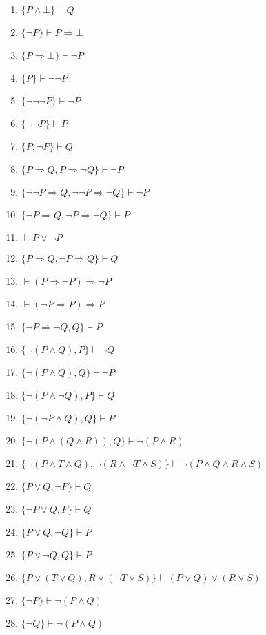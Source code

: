 \begin{enumerate}
    \item $\{P \land\bot \} \vdash Q$
    \item $\{\neg P\} \vdash P \Rightarrow  \bot$
    \item $\{P \Rightarrow  \bot\} \vdash \neg P$
    \item $\{P\} \vdash \neg \neg P$
    \item $\{\neg \neg \neg P\} \vdash \neg P$
    \item $\{\neg \neg P\} \vdash P$
    \item $\{P, \neg P\} \vdash Q$
    \item $\{P \Rightarrow Q, P \Rightarrow \neg Q\} \vdash \neg P$
    \item $\{\neg \neg P \Rightarrow Q, \neg \neg P \Rightarrow \neg Q\} \vdash \neg P$
    \item $\{\neg P \Rightarrow Q, \neg P \Rightarrow \neg Q\} \vdash P$
    \item $\vdash P \lor \neg P$
    \item $\{P \Rightarrow Q, \neg P \Rightarrow Q\} \vdash Q$
    \item $\vdash (P \Rightarrow \neg P) \Rightarrow \neg P$
    \item $\vdash (\neg P \Rightarrow P) \Rightarrow P$
    \item $\{\neg P \Rightarrow \neg Q, Q\} \vdash P$
    \item $\{\neg (P \land Q), P\} \vdash \neg Q$
    \item $\{\neg (P \land Q), Q\} \vdash \neg P$
    \item $\{\neg (P \land \neg Q), P\} \vdash Q$
    \item $\{\neg (\neg P \land Q), Q\} \vdash P$
    \item $\{\neg (P \land (Q \land R)), Q\} \vdash \neg (P \land R)$
    \item $\{\neg (P \land T \land Q), \neg (R \land \neg T \land S)\} \vdash \neg (P \land Q \land R \land S)$
    \item $\{P \lor Q, \neg P\} \vdash Q$
    \item $\{\neg P \lor Q, P\} \vdash Q$
    \item $\{P \lor Q, \neg Q\} \vdash P$
    \item $\{P \lor \neg Q, Q\} \vdash P$
    \item $\{P \lor (T \lor Q), R \lor (\neg T \lor S)\} \vdash (P \lor Q) \lor (R \lor S)$
    \item $\{\neg P\} \vdash \neg (P \land Q)$
    \item $\{\neg Q\} \vdash \neg (P \land Q)$

\end{enumerate}
